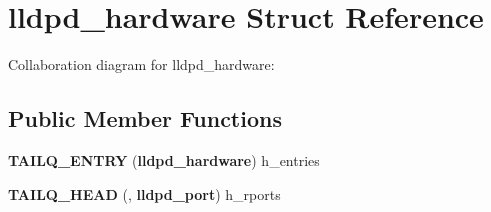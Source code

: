 \section{lldpd\-\_\-hardware \-Struct \-Reference}
\label{structlldpd__hardware}


\-Collaboration diagram for lldpd\-\_\-hardware\-:
\subsection*{\-Public \-Member \-Functions}
\begin{DoxyCompactItemize}
\item 
{\bfseries \-T\-A\-I\-L\-Q\-\_\-\-E\-N\-T\-R\-Y} ({\bf lldpd\-\_\-hardware}) h\-\_\-entries\label{structlldpd__hardware_affef0e25817c7dd50a520f9a9f19d0f2}

\item 
{\bfseries \-T\-A\-I\-L\-Q\-\_\-\-H\-E\-A\-D} (, {\bf lldpd\-\_\-port}) h\-\_\-rports\label{structlldpd__hardware_ac82e6aa072b476b83bef7f6801855ab2}

\end{DoxyCompactItemize}
